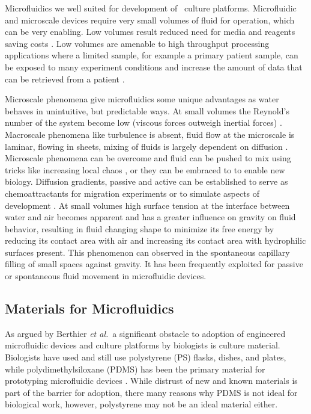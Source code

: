 Microfluidics we well suited for development of \invitro\ culture platforms. Microfluidic and microscale devices require very small volumes of fluid for operation, which can be very enabling. Low volumes result reduced need for media and reagents saving costs \cite{Ohno2008a, Situma2006}. Low volumes are amenable to high throughput processing applications where a limited sample, for example a primary patient sample, can be exposed to many experiment conditions and increase the amount of data that can be retrieved from a patient \cite{Young2012}. 

Microscale phenomena give microfluidics some unique advantages as water behaves in unintuitive, but predictable ways. At small volumes the Reynold's number of the system become low (viscous forces outweigh inertial forces) \cite{Beebe2002a}. Macroscale phenomena like turbulence is absent, fluid flow at the microscale is laminar, flowing in sheets, mixing of fluids is largely dependent on diffusion \cite{purcell1977life}. Microscale phenomena can be overcome and fluid can be pushed to mix using tricks like increasing local chaos \cite{DeMello2006, Stroock2004}, or they can be embraced to to enable new \invitro biology. Diffusion gradients, passive and active can be established to serve as chemoattractants \cite{Keenan2008} for migration experiments or to simulate aspects of development \cite{Berthier2014a}. At small volumes high surface tension at the interface between water and air becomes apparent and has a greater influence on gravity on fluid behavior, resulting in fluid changing shape to minimize its free energy by reducing its contact area with air and increasing its contact area with hydrophilic surfaces present. This phenomenon can observed in the spontaneous capillary filling of small spaces against gravity. It has been frequently exploited for passive or spontaneous fluid movement in microfluidic devices.

\subsection{Materials for Microfluidics}
As argued by Berthier \textit{et al.}\ a significant obstacle to adoption of engineered microfluidic devices and culture platforms by biologists is culture material. Biologists have used and still use polystyrene (PS) flasks, dishes, and plates, while polydimethylsiloxane (PDMS) has been the primary material for prototyping microfluidic devices \cite{Berthier2012} . While distrust of new and known materials is part of the barrier for adoption, there many reasons why PDMS is not ideal for biological work, however, polystyrene may not be an ideal material either.


